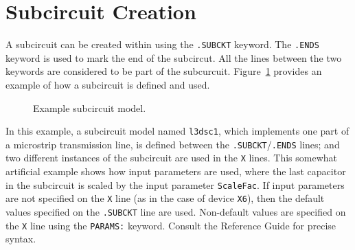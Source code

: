 \clearpage
\section{Subcircuit Creation}
\label{Subcircuit_Sect}

A subcircuit can be created within \Xyce{} using the \texttt{.SUBCKT} keyword.
The \texttt{.ENDS} keyword is used to mark the end of the subcircut. All the
lines between the two keywords are considered to be part of the subcurcuit.  
Figure~\ref{Subcircuit_Example} provides an example of how a subcircuit is
defined and used.

\begin{figure}[H]
\begin{centering}
\caption{Example subcircuit model.\label{Subcircuit_Example}}
\end{centering}
\end{figure}

In this example, a subcircuit model named \texttt{l3dsc1}, which implements one
part of a microstrip transmission line, is defined between the
\texttt{.SUBCKT}/\texttt{.ENDS} lines; and two different instances of the
subcircuit are used in the \texttt{X} lines.  This somewhat artificial example
shows how input parameters are used, where the last capacitor in the subcircuit
is scaled by the input parameter \texttt{ScaleFac}.  If input parameters are
not specified on the \texttt{X} line (as in the case of device \texttt{X6}),
then the default values specified on the \texttt{.SUBCKT} line are used.
Non-default values are specified on the \texttt{X} line using the
\texttt{PARAMS:} keyword.  Consult the \Xyce{} Reference Guide\ReferenceGuide{}
for precise syntax.

